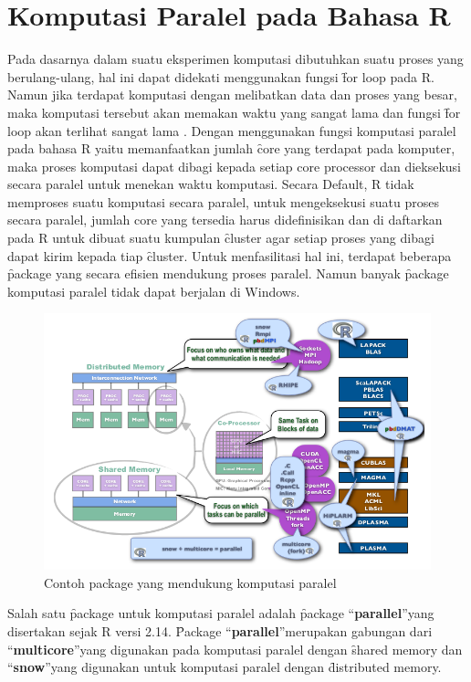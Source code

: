 \section{Komputasi Paralel pada Bahasa R}
Pada dasarnya dalam suatu eksperimen komputasi dibutuhkan suatu proses yang berulang-ulang, hal ini dapat didekati menggunakan fungsi \f{for loop} pada R. Namun jika terdapat komputasi dengan melibatkan data dan proses yang besar, maka komputasi tersebut akan memakan waktu yang sangat lama dan fungsi \f{for loop} akan terlihat sangat lama . Dengan menggunakan fungsi komputasi paralel pada bahasa R yaitu memanfaatkan jumlah \f{core} yang terdapat pada komputer, maka proses komputasi dapat dibagi kepada setiap core processor dan dieksekusi secara paralel untuk menekan waktu komputasi.
Secara Default, R tidak memproses suatu komputasi secara paralel, untuk mengeksekusi suatu proses secara paralel, jumlah core yang tersedia harus didefinisikan dan di daftarkan pada R untuk dibuat suatu kumpulan \f{cluster} agar setiap proses yang dibagi dapat kirim kepada tiap \f{cluster}. Untuk menfasilitasi hal ini, terdapat beberapa \f{package} yang secara efisien mendukung proses paralel.  Namun banyak \f{package} komputasi paralel tidak dapat berjalan di Windows.

\begin{figure}
\centering
\includegraphics[width=0.7\linewidth]{./pics/parallelpackage}
\caption{Contoh package yang mendukung komputasi paralel \cite{r.schmidt}}
\label{fig:parallelpackage}
\end{figure}

Salah satu \f{package} untuk komputasi paralel adalah \f{package} \textquotedblleft \textbf{parallel}\textquotedblright\space yang disertakan sejak R versi 2.14.  \f{Package} \textquotedblleft \textbf{parallel}\textquotedblright\space merupakan gabungan dari \textquotedblleft \textbf{multicore}\textquotedblright\space yang digunakan pada komputasi paralel dengan \f{shared memory} dan \textquotedblleft \textbf{snow}\textquotedblright\space yang digunakan untuk komputasi paralel dengan \f{distributed memory}.

